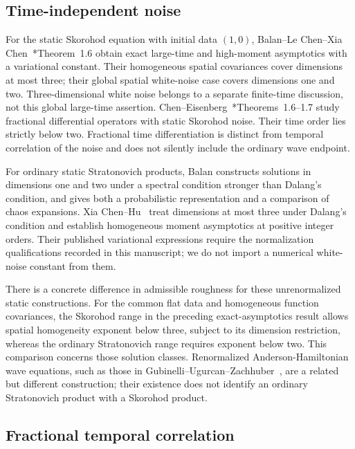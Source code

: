 \subsection{Time-independent noise}

For the static Skorohod equation with initial data $(1,0)$, Balan--Le Chen--Xia
Chen~\cite{balan.chen.ea:22:exact}*{Theorem~1.6} obtain exact large-time and
high-moment asymptotics with a variational constant. Their homogeneous spatial
covariances cover dimensions at most three; their global spatial white-noise
case covers dimensions one and two. Three-dimensional white noise belongs to
a separate finite-time discussion, not this global large-time assertion.
Chen--Eisenberg~\cite{chen.eisenberg:23:interpolating}*{Theorems~1.6--1.7}
study fractional differential operators with static Skorohod noise. Their time
order lies strictly below two. Fractional time differentiation is distinct
from temporal correlation of the noise and does not silently include the
ordinary wave endpoint.

For ordinary static Stratonovich products, Balan
\cite{balan:22:stratonovich} constructs solutions in dimensions one and two
under a spectral condition stronger than Dalang's condition, and gives both
a probabilistic representation and a comparison of chaos expansions.
Xia Chen--Hu~\cite{chen.hu:25:hyperbolic} treat dimensions at most three under
Dalang's condition and establish homogeneous moment asymptotics at positive
integer orders. Their published variational expressions require the
normalization qualifications recorded in this manuscript; we do not import
a numerical white-noise constant from them.

There is a concrete difference in admissible roughness for these unrenormalized
static constructions. For the common flat data and homogeneous function
covariances, the Skorohod range in the preceding exact-asymptotics result
allows spatial homogeneity exponent below three, subject to its dimension
restriction, whereas the ordinary Stratonovich range requires exponent below
two. This comparison concerns those solution classes. Renormalized
Anderson-Hamiltonian wave equations, such as those in
Gubinelli--Ugurcan--Zachhuber~\cite{gubinelli.ugurcan.ea:20:semilinear}, are a
related but different construction; their existence does not identify an
ordinary Stratonovich product with a Skorohod product.

\subsection{Fractional temporal correlation}


